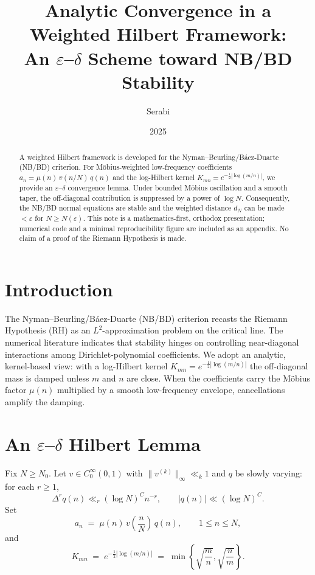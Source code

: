 \documentclass[11pt]{article}
\title{Analytic Convergence in a Weighted Hilbert Framework:\\
An $\varepsilon$--$\delta$ Scheme toward NB/BD Stability}
\author{Serabi}
\date{2025}
\theoremstyle{remark}
\begin{document}
\maketitle

\begin{abstract}
A weighted Hilbert framework is developed for the Nyman--Beurling/B\'aez-Duarte (NB/BD) criterion.
For M\"obius-weighted low-frequency coefficients $a_n=\mu(n)\,v(n/N)\,q(n)$ and the log-Hilbert kernel
$K_{mn}=e^{-\tfrac12 |\log(m/n)|}$, we provide an $\varepsilon$--$\delta$ convergence lemma.
Under bounded M\"obius oscillation and a smooth taper, the off-diagonal contribution is suppressed by a power of $\log N$.
Consequently, the NB/BD normal equations are stable and the weighted distance $d_N$ can be made $<\varepsilon$ for $N\ge N(\varepsilon)$.
This note is a mathematics-first, orthodox presentation; numerical code and a minimal reproducibility figure are included as an appendix.
No claim of a proof of the Riemann Hypothesis is made.
\end{abstract}

\section{Introduction}
The Nyman--Beurling/B\'aez-Duarte (NB/BD) criterion recasts the Riemann Hypothesis (RH) as an
$L^2$-approximation problem on the critical line. The numerical literature indicates that stability hinges on
controlling near-diagonal interactions among Dirichlet-polynomial coefficients. We adopt an analytic, kernel-based
view: with a log-Hilbert kernel $K_{mn}=e^{-\tfrac12 |\log(m/n)|}$ the off-diagonal mass is damped unless
$m$ and $n$ are close. When the coefficients carry the M\"obius factor $\mu(n)$ multiplied by a smooth
low-frequency envelope, cancellations amplify the damping.

\section{An $\varepsilon$--$\delta$ Hilbert Lemma}
Fix $N\ge N_0$. Let $v\in C_0^\infty(0,1)$ with $\|v^{(k)}\|_\infty\ll_k 1$ and $q$ be slowly varying:
for each $r\ge 1$,
\begin{equation}\label{eq:q-smooth}
\Delta^r q(n) \ll_r (\log N)^C n^{-r}, \qquad |q(n)|\ll (\log N)^C .
\end{equation}
Set
\begin{equation}\label{eq:an-def}
a_n \;=\; \mu(n)\,v\!\left(\frac{n}{N}\right)\,q(n),\qquad 1\le n\le N,
\end{equation}
and
\begin{equation}\label{eq:K-def}
K_{mn} \;=\; e^{-\tfrac12 |\log(m/n)|} \;=\; \min\!\left\{\sqrt{\frac{m}{n}},\sqrt{\frac{n}{m}}\right\}.
\end{equation}
\end{document}
